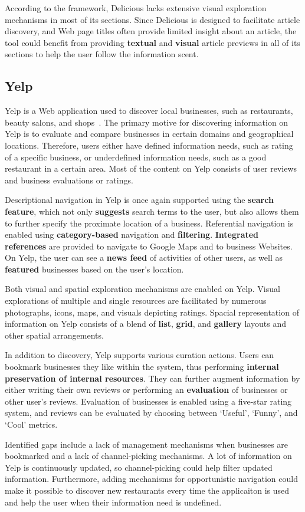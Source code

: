 \documentclass{sigchi}
\begin{document}
{According to the framework, Delicious lacks extensive visual exploration mechanisms in most of its sections. Since Delicious is designed to facilitate article discovery, and Web page titles often provide limited insight about an article, the tool could benefit from providing \textbf{textual} and \textbf{visual} article previews in all of its sections to help the user follow the information scent. 
} %

{\subsection{Yelp}
Yelp is a Web application used to discover local businesses, such as restaurants, beauty salons, and shops~\cite{luca2011reviews}. The primary motive for discovering information on Yelp is to evaluate and compare businesses in certain domains and geographical locations. Therefore, users either have defined information needs, such as rating of a specific business, or underdefined information needs, such as a good restaurant in a certain area. Most of the content on Yelp consists of user reviews and business evaluations or ratings. 

Descriptional navigation in Yelp is once again supported using the \textbf{search feature}, which not only \textbf{suggests} search terms to the user, but also allows them to further specify the proximate location of a business. Referential navigation is enabled using \textbf{category-based} navigation and \textbf{filtering}. \textbf{Integrated references} are provided to navigate to Google Maps and to business Websites.  On Yelp, the user can see a \textbf{news feed} of activities of other users, as well as \textbf{featured} businesses based on the user's location. 

Both visual and spatial exploration mechanisms are enabled on Yelp. Visual explorations of multiple and single resources are facilitated by numerous photographs, icons, maps, and visuals depicting ratings. Spacial representation of information on Yelp consists of a blend of \textbf{list}, \textbf{grid}, and \textbf{gallery} layouts and other spatial arrangements.

In addition to discovery, Yelp supports various curation actions. Users can bookmark businesses they like within the system, thus performing \textbf{internal preservation of internal resources}. They can further augment information by either writing their own reviews or performing an \textbf{evaluation} of businesses or other user's reviews. Evaluation of businesses is enabled using a five-star rating system, and reviews can be evaluated by choosing between `Useful', `Funny', and `Cool' metrics. 

Identified gaps include a lack of management mechanisms when businesses are bookmarked and a lack of channel-picking mechanisms. A lot of information on Yelp is continuously updated, so channel-picking could help filter updated information. Furthermore, adding mechanisms for opportunistic navigation could make it possible to discover new restaurants every time the applicaiton is used and help the user when their information need is undefined.
 
} %
\end{document}
